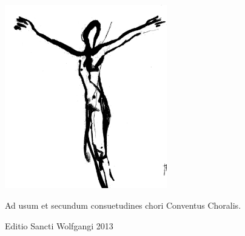 \documentclass[a4paper, twoside, 12pt]{article}
\newcommand{\annusEditionis}{2013}
\begin{document}
\def\greinitialformat#1{%
{\fontsize{40}{40}\selectfont #1}%
}

\pagestyle{empty}

\setlength{\columnseprule}{1pt} %
\setlength{\columnsep}{20pt} %

\begin{titulusOfficii}
\end{titulusOfficii}


\vspace{1.6cm}

\begin{center}
\includegraphics[height=8cm]{imagines/crux.jpg}
\end{center}

\vfill

\begin{center}
Ad usum et secundum consuetudines chori \guillemotright Conventus Choralis\guillemotleft.

Editio Sancti Wolfgangi \annusEditionis
\end{center}

\pagebreak

\renewcommand{\headrulewidth}{0pt} %
\fancyhf{}
\pagestyle{fancy}

\begin{multicols}{2}
\anteOfficiumOratio
\columnbreak

\postOfficiumOratio
\end{multicols}
\end{document}
